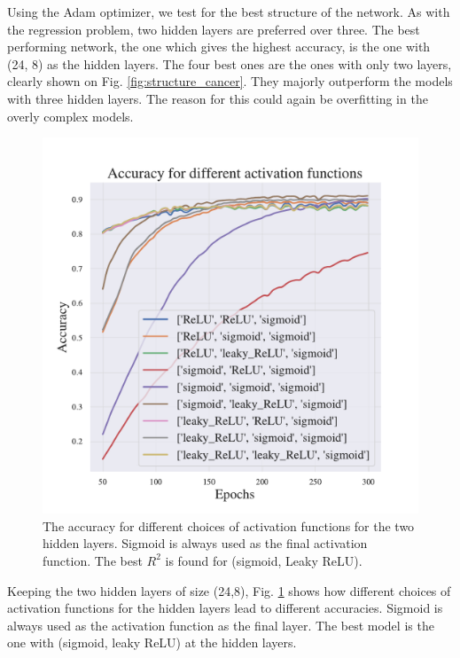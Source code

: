 Using the Adam optimizer, we test for the best structure of the network. As with the regression problem, two hidden layers are preferred over three. 
The best performing network, the one which gives the highest accuracy, is the one with (24, 8) as the hidden layers. The four best ones are the ones with only two layers, clearly shown on Fig. \ref{fig:structure_cancer}. They majorly outperform the models with three hidden layers. 
The reason for this could again be overfitting in the overly complex models.

\begin{figure}[h!]
    \centering
    \includegraphics[width=1.0\linewidth]{project_2/figures/Accuracy for different activation functions_classification.pdf}
    \caption{The accuracy for different choices of activation functions for the two hidden layers. Sigmoid is always used as the final activation function. The best $R^2$ is found for (sigmoid, Leaky ReLU).}
    \label{fig:activations_cancer}
\end{figure}

Keeping the two hidden layers of size (24,8), Fig. \ref{fig:activations_cancer} shows how different choices of activation functions for the hidden layers lead to different accuracies. 
Sigmoid is always used as the activation function as the final layer. 
The best model is the one with (sigmoid, leaky ReLU) at the hidden layers. 

